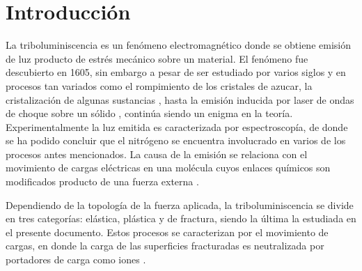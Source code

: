 \documentclass[fleqn,10pt]{SelfArx}
\begin{document}
\flushbottom %

\maketitle %


\thispagestyle{empty} %




\section*{Introducci\'on} %

La triboluminiscencia es un fen\'omeno electromagn\'etico donde se obtiene emisi\'on de luz producto de estr\'es mec\'anico sobre un material. El fen\'omeno fue descubierto en 1605, sin embargo a pesar de ser estudiado por varios siglos y en procesos tan variados como el rompimiento de los cristales de azucar, la cristalizaci\'on de algunas sustancias \cite{weiser_1917}, hasta la emisi\'on inducida por laser de ondas de choque sobre un s\'olido \cite{tsuboi_seto_kitamura_2008}, contin\'ua siendo un enigma en la teor\'ia. Experimentalmente la luz emitida es caracterizada por espectroscop\'ia, de donde se ha podido concluir que el nitr\'ogeno se encuentra involucrado en varios de los procesos antes mencionados. La causa de la emisi\'on se relaciona con el movimiento de cargas el\'ectricas en una mol\'ecula cuyos enlaces qu\'imicos son modificados producto de una fuerza externa \cite{olawale_okoli_fontenot_hollerman_2016}.

Dependiendo de la topolog\'ia de la fuerza aplicada, la triboluminiscencia se divide en tres categor\'ias: el\'astica, pl\'astica y de fractura, siendo la \'ultima la estudiada en el presente documento. Estos procesos se caracterizan por el movimiento de cargas, en donde la carga de las superficies fracturadas es neutralizada por portadores de carga como iones \cite{olawale_okoli_fontenot_hollerman_2016}. 
\end{document}
